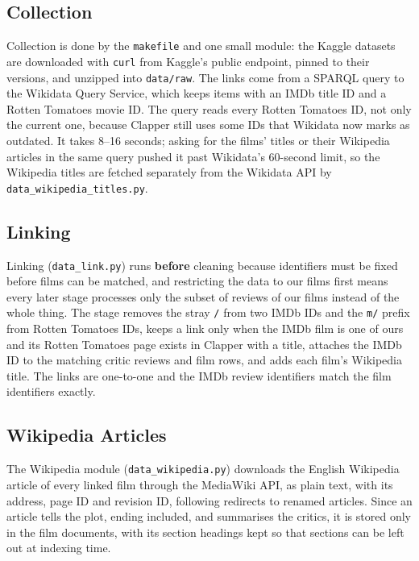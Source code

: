 \subsection{Collection}
Collection is done by the \texttt{makefile} and one small module: the Kaggle datasets are downloaded with \texttt{curl} from Kaggle's public endpoint, pinned to their versions, and unzipped into \texttt{data/raw}. The links come from a SPARQL query to the Wikidata Query Service, which keeps items with an IMDb title ID and a Rotten Tomatoes movie ID. The query reads every Rotten Tomatoes ID, not only the current one, because Clapper still uses some IDs that Wikidata now marks as outdated. It takes 8--16 seconds; asking for the films' titles or their Wikipedia articles in the same query pushed it past Wikidata's 60-second limit, so the Wikipedia titles are fetched separately from the Wikidata API by \texttt{data_wikipedia_titles.py}.

\subsection{Linking}
Linking (\texttt{data_link.py}) runs \textbf{before} cleaning because identifiers must be fixed before films can be matched, and restricting the data to our films first means every later stage processes only the subset of reviews of our films instead of the whole thing. The stage removes the stray \texttt{/} from two IMDb IDs and the \texttt{m/} prefix from Rotten Tomatoes IDs, keeps a link only when the IMDb film is one of ours and its Rotten Tomatoes page exists in Clapper with a title, attaches the IMDb ID to the matching critic reviews and film rows, and adds each film's Wikipedia title. The links are one-to-one and the IMDb review identifiers match the film identifiers exactly.

\subsection{Wikipedia Articles}
The Wikipedia module (\texttt{data_wikipedia.py}) downloads the English Wikipedia article of every linked film through the MediaWiki API, as plain text, with its address, page ID and revision ID, following redirects to renamed articles. Since an article tells the plot, ending included, and summarises the critics, it is stored only in the film documents, with its section headings kept so that sections can be left out at indexing time.

